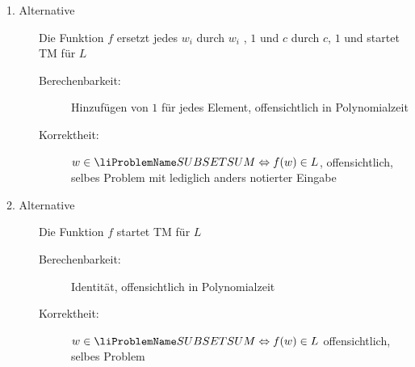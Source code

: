 \documentclass{lehramt-informatik-aufgabe}
\begin{document}
\begin{enumerate}
\begin{liAntwort}
\begin{description}
%

\item[1. Alternative]

Die Funktion $f$ ersetzt jedes $w_i$ durch $w_i$ , $1$ und $c$ durch
$c$, $1$ und startet TM für $L$

\begin{description}
\item[Berechenbarkeit:]

Hinzufügen von $1$ für jedes Element, offensichtlich in Polynomialzeit

\item[Korrektheit:]

$w \in \ssp \Leftrightarrow f (w) \in L$, offensichtlich, selbes Problem
mit lediglich anders notierter Eingabe
\end{description}

%

\item[2. Alternative]

Die Funktion $f$ startet TM für $L$

\begin{description}
\item[Berechenbarkeit:]

Identität, offensichtlich in Polynomialzeit

\item[Korrektheit:]

$w \in \ssp \Leftrightarrow f (w) \in L$ offensichtlich, selbes Problem

\end{description}

\end{description}
\end{liAntwort}

\end{enumerate}
\end{document}
